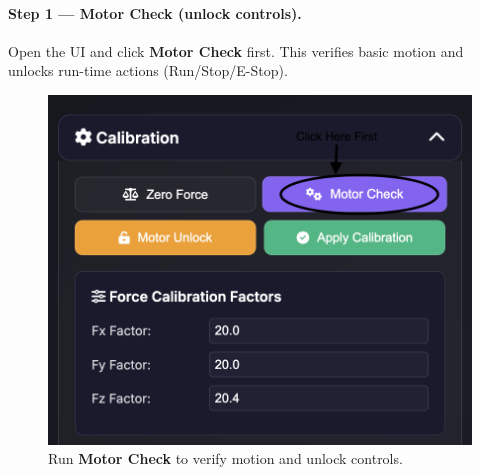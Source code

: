 \documentclass[
    twocolumn,
    fontsize = 10pt,
    parskip = half+,
    headings = small,
    headwidth = text,
    footwidth = text,
]{scrartcl}
\begin{document}
\paragraph{\textbf{Step 1 — Motor Check (unlock controls).}}
Open the UI and click \textbf{Motor Check} first. This verifies basic motion and unlocks run-time actions (Run/Stop/E-Stop).
\begin{figure}[htbp]\centering
  \includegraphics[width=.9\linewidth]{pics/motor-check.png}
  \caption{Run \textbf{Motor Check} to verify motion and unlock controls.}
  \label{fig:sb-motor-check}
\end{figure}
\end{document}
